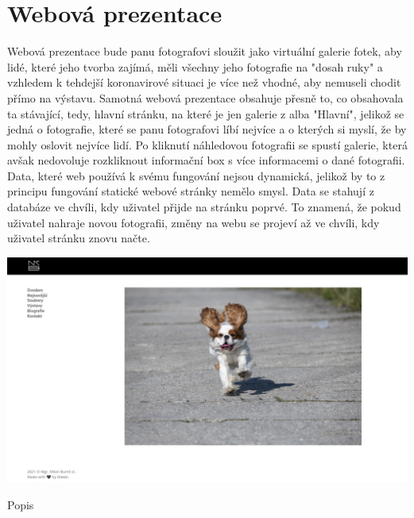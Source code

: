 \documentclass[12pt,a4paper]{report}
\begin{document}
  \chapter{Webová prezentace}
  Webová prezentace bude panu fotografovi sloužit jako virtuální galerie fotek, aby lidé, které jeho
  tvorba zajímá, měli všechny jeho fotografie na "dosah ruky" a vzhledem k tehdejší koronavirové
  situaci je více než vhodné, aby nemuseli chodit přímo na výstavu.
  Samotná webová prezentace obsahuje přesně to, co obsahovala ta stávající, tedy, hlavní stránku,
  na které je jen galerie z alba "Hlavní", jelikož se jedná o fotografie, které se panu fotografovi líbí
  nejvíce a o kterých si myslí, že by mohly oslovit nejvíce lidí. Po kliknutí náhledovou fotografii se
  spustí galerie, která avšak nedovoluje rozkliknout informační box s více informacemi o dané
  fotografii.
  Data, které web používá k svému fungování nejsou dynamická, jelikož by to z principu fungování
  statické webové stránky nemělo smysl. Data se stahují z databáze ve chvíli, kdy uživatel přijde na
  stránku poprvé. To znamená, že pokud uživatel nahraje novou fotografii, změny na webu se
  projeví až ve chvíli, kdy uživatel stránku znovu načte.

  \vspace*{0.5cm}
  \noindent\includegraphics[width=\linewidth]{dmp-bures.png}
  \begin{center}
    Popis
  \end{center}
  \vspace*{0.5cm}
\end{document}
